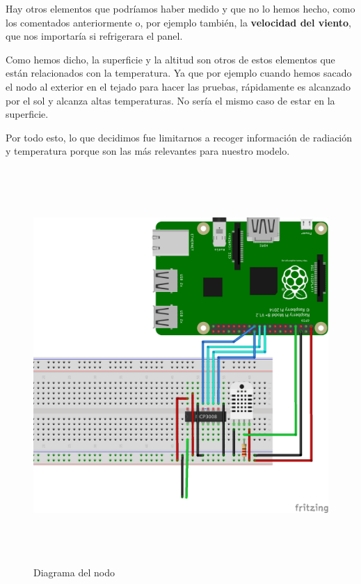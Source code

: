 Hay otros elementos que podríamos haber medido y que no lo hemos hecho, como los comentados anteriormente o, por ejemplo también, la \textbf{velocidad del viento}, que nos importaría si refrigerara el panel.

Como hemos dicho, la superficie y la altitud son otros de estos elementos que están relacionados con la temperatura. Ya que por ejemplo cuando hemos sacado el nodo al exterior en el tejado para hacer las pruebas, rápidamente es alcanzado por el sol y alcanza altas temperaturas. No sería el mismo caso de estar en la superficie.

Por todo esto, lo que decidimos fue limitarnos a recoger información de radiación y temperatura porque son las más relevantes para nuestro modelo.

\begin{figure}[htb]
	
	\begin{center}
		\includegraphics[width=15cm,height=15cm]{figures/solar_project_node_diagram.png}
		\caption{Diagrama del nodo}
	\end{center}
	
	\label{node-diagram}
\end{figure}

